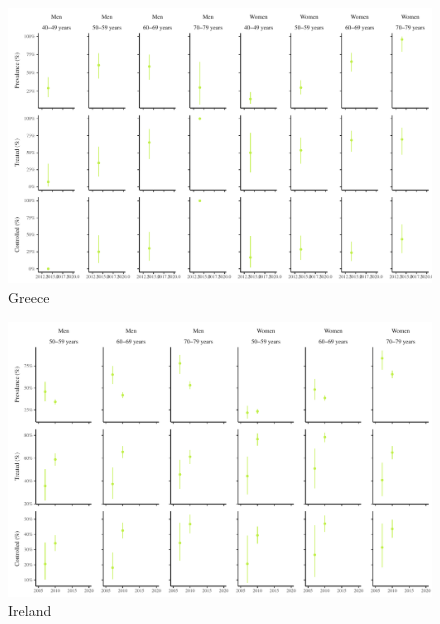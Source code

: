 \documentclass[12pt]{article}
\begin{document}
\begin{appendix}
\begin{refsection}
\begin{landscape}
        \begin{figure}[H]
            \centering
            \includegraphics[width=\linewidth]{../3_figures/countries/fig_greece.pdf}
            \caption{Greece}
            \label{fig:greece}
        \end{figure}

        \begin{figure}[H]
            \centering
            \includegraphics[width=\linewidth]{../3_figures/countries/fig_ireland.pdf}
            \caption{Ireland}
            \label{fig:ireland}
        \end{figure}


\end{landscape}
\end{refsection}
\end{appendix}
\end{document}
